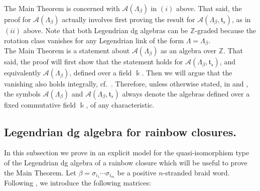 \documentclass[11pt]{article}
\newcommand{\kk}{\Bbbk}
\newcommand{\ZZ}{\mathbb Z}
\newcommand{\La}{\Lambda}
\newcommand{\SA}{\mathcal A}
\newcommand{\ST}{\mathfrak t}
\begin{document}
\noindent The Main Theorem is concerned with $\SA(\La_\beta)$ in $(i)$ above. That said, the proof for $\SA(\La_\beta)$ actually involves first proving the result for $\SA(\La_\beta,\ST_{s})$, as in $(ii)$ above. Note that both Legendrian dg algebras can be $\ZZ$-graded because the rotation class vanishes for any Legendrian link of the form $\La=\La_\beta$.\\

The Main Theorem is a statement about $\SA(\La_\beta)$ as an algebra over $\ZZ$. That said, the proof will first show that the statement holds for $\SA(\La_\beta,\ST_{s})$, and equivalently $\SA(\La_\beta)$, defined over a field $\kk$. Then we will argue that the vanishing also holds integrally, cf.~. Therefore, unless otherwise stated, in  and , the symbols $\SA(\La_\beta)$ and $\SA(\La_\beta,\ST_{s})$ always denote the algebras defined over a fixed commutative field $\kk$, of any characteristic.

\subsection{ Legendrian dg algebra for rainbow closures.}\label{ssec:dga_rainbow} In this subsection we prove in  an explicit model for the quasi-isomorphism type of the Legendrian dg algebra of a rainbow closure which will be useful to prove the Main Theorem. Let \(\beta=\sigma_{i_1}\cdots\sigma_{i_m}\) be a positive \(n\)-stranded braid word. Following \cite[Section 5.1]{CasalsNg}, we introduce the following matrices:
\end{document}
